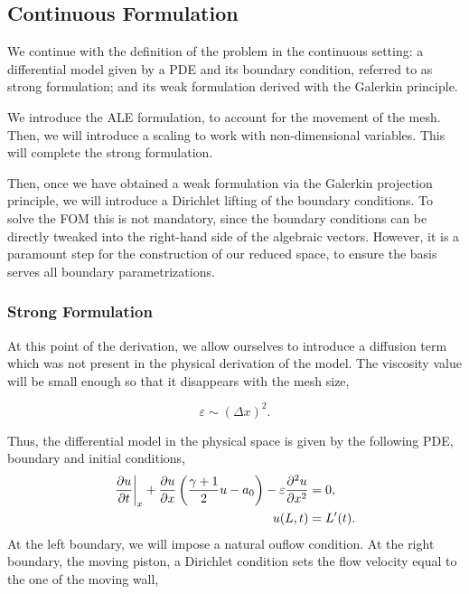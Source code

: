 \documentclass[../../thesis.tex]{subfiles}
\begin{document}
\subsection{Continuous Formulation}
We continue with the definition of the problem in the continuous setting: 
a differential model given by a PDE and its boundary condition, referred to as {strong formulation}; 
and its weak formulation derived with the Galerkin principle.

We introduce the ALE formulation, to account for the movement of the mesh.
Then, we will introduce a scaling to work with non-dimensional variables.
This will complete the strong formulation.

Then, once we have obtained a weak formulation via the Galerkin projection principle,
we will introduce a Dirichlet lifting of the boundary conditions.
To solve the FOM this is not mandatory, since the boundary conditions can be 
directly tweaked into the right-hand side of the algebraic vectors.
However, it is a paramount step for the construction of our reduced space,
to ensure the basis serves all boundary parametrizations.

\subsubsection{Strong Formulation}
At this point of the derivation, we allow ourselves to introduce a diffusion term which was not present in the physical derivation of the model.
The viscosity value will be small enough so that it disappears with the mesh size,

\begin{equation}
    \varepsilon \sim \left(\Delta x\right)^2. 
\end{equation}

Thus, the differential model in the physical space is given by the following PDE, boundary and initial conditions,
\begin{subequations}
    \begin{align}
        \left.\frac{\partial u}{\partial t}\right|_{x} 
        + \frac{\partial u}{\partial x}\left(\frac{\gamma+1}{2}u - a_0\right) 
        - \varepsilon \pdv[2]{u}{x} &= 0, \label{eq:1d_fom_strong_pde} \\
        u(L, t) &= L'(t). 
    \end{align}
\end{subequations}
At the left boundary, we will impose a natural ouflow condition.
At the right boundary, the moving piston, a Dirichlet condition sets the flow velocity equal to the one of the moving wall,
\end{document}
